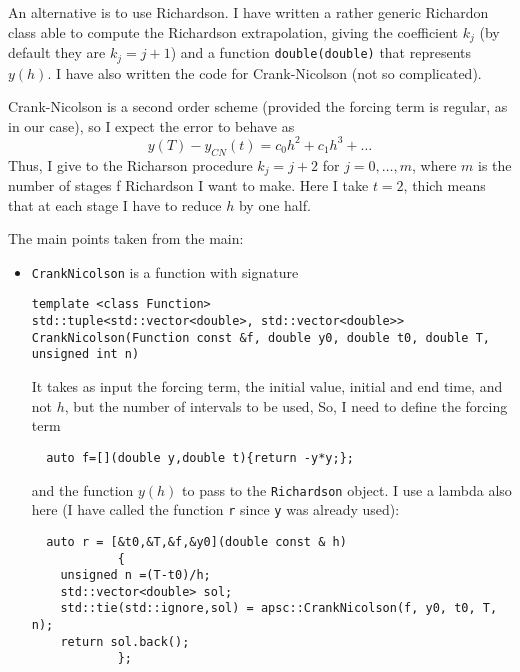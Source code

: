 \documentclass[10pt,a4paper,twoside]{article}
\begin{document}
An alternative is to use Richardson. I have written a rather generic Richardon class able to compute the Richardson extrapolation, giving the
coefficient $k_j$ (by default they are $k_j=j+1$) and a function \lstinline!double(double)! that represents $y(h)$. I have also written the code for Crank-Nicolson (not so complicated).

Crank-Nicolson is a second order scheme (provided the forcing term is regular, as in our case), so I expect the error to behave as
\[
  y(T)-y_{CN}(t)= c_0h^2+c_1h^3+\ldots
\]
Thus, I give to the Richarson procedure $k_j=j+2$ for $j=0,\ldots,m$, where $m$ is the number of stages f Richardson I want to make. Here I take $t=2$, thich means that at each stage I have to reduce $h$ by one half. 


The main points taken from the main:
\begin{itemize}
\item \lstinline!CrankNicolson! is a function with signature
\begin{lstlisting}
template <class Function>
std::tuple<std::vector<double>, std::vector<double>>
CrankNicolson(Function const &f, double y0, double t0, double T, unsigned int n)
\end{lstlisting}
It takes as input the forcing term, the initial value, initial and end time, and not $h$, but the number of intervals to be used,
So, I need to define the forcing term
\begin{lstlisting}
  auto f=[](double y,double t){return -y*y;};
\end{lstlisting}
and the function $y(h)$ to pass to the \lstinline!Richardson! object. I use a lambda also here (I have called the function \lstinline!r! since
\lstinline!y! was already used):
\begin{lstlisting}
  auto r = [&t0,&T,&f,&y0](double const & h)
            {
    unsigned n =(T-t0)/h;
    std::vector<double> sol;
    std::tie(std::ignore,sol) = apsc::CrankNicolson(f, y0, t0, T, n);
    return sol.back();
            };


\end{lstlisting}
\end{itemize}
\end{document}
